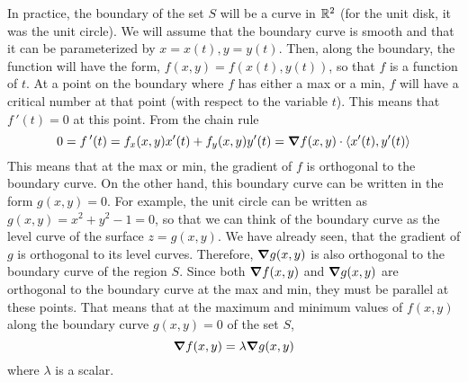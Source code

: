 \documentclass[handout]{ximera}
\begin{document}
In practice, the boundary of the set $S$ will be a curve in $\mathbb R^2$ (for the unit disk, it was the unit circle).
We will assume that the boundary curve is smooth and that it can be parameterized by $x = x(t), y = y(t)$.
Then, along the boundary, the function will have the form, $f(x, y) = f(x(t), y(t))$, so that $f$ is a function of $t$.
At a point on the boundary where $f$ has either a max or a min, $f$ will have a critical number at that point (with respect to the variable $t$).
This means that $f\,'(t) = 0$ at this point. From the chain rule
\[
0 = f\,'(t) = f_x(x, y) x'(t) + f_y(x,y) y'(t) = \boldsymbol\nabla f(x,y) \cdot \left\langle x'(t), y'(t)\right\rangle
\]
This means that at the max or min, the gradient of $f$ is orthogonal to the boundary curve.
On the other hand, this boundary curve can be written in the form $g(x,y) = 0$. For example, the unit circle can be written as $g(x,y) = x^2 + y^2 - 1 = 0$,
so that we can think of the boundary curve as the level curve of the surface $z = g(x,y)$. We have already seen, that the gradient of $g$ is orthogonal
to its level curves.  Therefore, $\boldsymbol\nabla g(x,y)$ is also orthogonal to the boundary curve of the region $S$.
Since both $\boldsymbol\nabla f(x,y)$ and $\boldsymbol\nabla g(x,y)$ are orthogonal to the boundary curve at the max and min, they must be parallel at these points.
That means that at the maximum and minimum values of $f(x,y)$ along the boundary curve $g(x,y) = 0$ of the set $S$, 
\[
\boldsymbol\nabla f(x,y) = \lambda \boldsymbol\nabla g(x,y)
\]
where $\lambda$ is a scalar.
\end{document}
